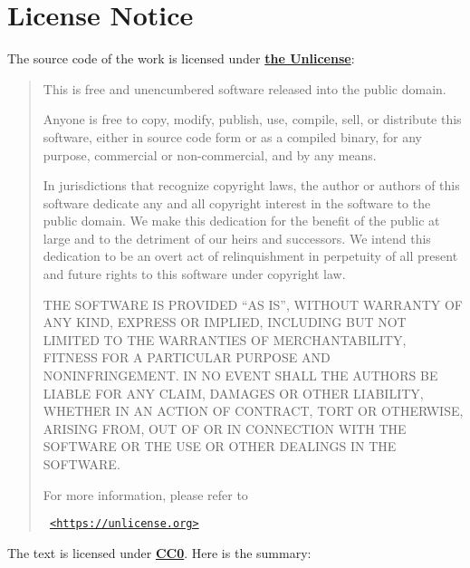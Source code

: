 \section*{License Notice}

The source code of the work is licensed under \hyperref{https://unlicense.org/}{}{}{\textbf{the Unlicense}}:

\begin{quotation}
    \sffamily

    This is free and unencumbered software released into the public domain.

    Anyone is free to copy, modify, publish, use, compile, sell, or distribute this software, either in source code form or as a compiled binary, for any purpose, commercial or non-commercial, and by any means.

    In jurisdictions that recognize copyright laws, the author or authors of this software dedicate any and all copyright interest in the software to the public domain. We make this dedication for the benefit of the public at large and to the detriment of our heirs and successors. We intend this dedication to be an overt act of relinquishment in perpetuity of all present and future rights to this software under copyright law.

    THE SOFTWARE IS PROVIDED ``AS IS'', WITHOUT WARRANTY OF ANY KIND, EXPRESS OR IMPLIED, INCLUDING BUT NOT LIMITED TO THE WARRANTIES OF MERCHANTABILITY, FITNESS FOR A PARTICULAR PURPOSE AND NONINFRINGEMENT. IN NO EVENT SHALL THE AUTHORS BE LIABLE FOR ANY CLAIM, DAMAGES OR OTHER LIABILITY, WHETHER IN AN ACTION OF CONTRACT, TORT OR OTHERWISE, ARISING FROM, OUT OF OR IN CONNECTION WITH THE SOFTWARE OR THE USE OR OTHER DEALINGS IN THE SOFTWARE.

    For more information, please refer to
    \begin{center}
        \texttt{ \hyperref{https://unlicense.org}{}{}{<https://unlicense.org>} }
    \end{center}
\end{quotation}

The text is licensed under \hyperref{https://creativecommons.org/publicdomain/zero/1.0/}{}{}{\textbf{CC0}}. Here is the summary:

